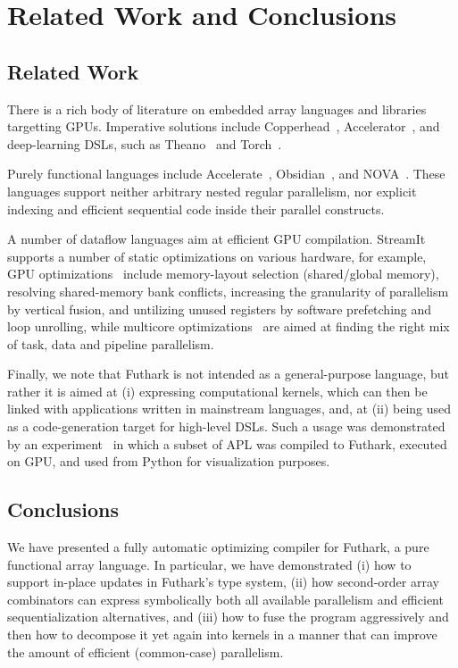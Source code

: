 \chapter{Related Work and Conclusions}

\section{Related Work}
\label{sec:relatedwork}

There is a rich body of literature on embedded array languages
and libraries targetting GPUs. Imperative solutions include
Copperhead~\cite{Copperhead}, Accelerator~\cite{MSaccelerator},
and deep-learning DSLs, such as Theano~\cite{Theano} and
Torch~\cite{Torch7}.

Purely functional languages include
Accelerate~\cite{mcdonell2013optimising},
Obsidian~\cite{claessen2012expressive}, and
NOVA~\cite{collins2014nova}.  These languages support neither
arbitrary nested regular parallelism, nor explicit indexing and
efficient sequential code inside their parallel constructs.

A number of dataflow languages aim at efficient GPU compilation.
StreamIt supports a number of static optimizations on various
hardware, for example, GPU
optimizations~\cite{Hormati:2011:SPS:1950365.1950409} include
memory-layout selection (shared/global memory), resolving
shared-memory bank conflicts, increasing the granularity of
parallelism by vertical fusion, and untilizing unused registers by
software prefetching and loop unrolling, while multicore
optimizations~\cite{Gordon:2006:ECT:1168857.1168877} are aimed at
finding the right mix of task, data and pipeline parallelism.

Finally, we note that Futhark is not intended as a general-purpose
language, but rather it is aimed at (i) expressing computational
kernels, which can then be linked with applications written in
mainstream languages, and, at (ii) being used as a code-generation
target for high-level DSLs.  Such a usage was demonstrated by an
experiment~\cite{ElsmanDybdal:Array:2014,Henriksen:2016:AGT:2975991.2975997}
in which a subset of APL was compiled to Futhark, executed on GPU, and
used from Python for visualization purposes.

\section{Conclusions}
\label{sec:conclusions}

We have presented a fully automatic optimizing compiler for Futhark, a
pure functional array language.  In particular, we have demonstrated
(i) how to support in-place updates in Futhark's type system, (ii) how
second-order array combinators can express symbolically both all
available parallelism and efficient sequentialization alternatives,
and (iii) how to fuse the program aggressively and then how to
decompose it yet again into kernels in a manner that can improve the
amount of efficient (common-case) parallelism.

